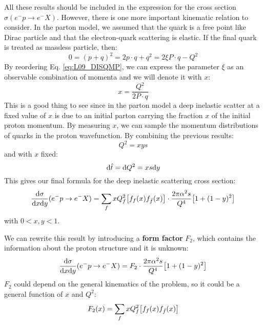 \documentclass[../../main/main.tex]{subfiles}
\begin{document}
All these results should be included in the expression for the cross section \( \sigma(e^-p \longrightarrow e^-X) \). However, there is one more important kinematic relation to consider. In the parton model, we assumed that the quark is a free point like Dirac particle and that the electron-quark scattering is elastic. If the final quark is treated as massless particle, then:
\begin{equation}
	0
	=
	(p + q)^2
	=
	2p \cdot q + q^2
	=
	2\xi P \cdot q - Q^2
	\label{eq:L09_DISQMP}
\end{equation}
By reordering Eq. \ref{eq:L09_DISQMP}, we can express the parameter \( \xi \) as an observable combination of momenta and we will denote it with \( x \):
\begin{equation}
	x
	=
	\frac{Q^2}{2P \cdot q}
	\label{eq:}
\end{equation}
This is a good thing to see since in the parton model a deep inelastic scatter at a fixed value of \( x \) is due to an initial parton carrying the fraction \( x \) of the initial proton momentum. By measuring \( x \), we can sample the momentum distributions of quarks in the proton wavefunction. By combining the previous results:
\begin{equation}
	Q^2
	=
	xys
	\label{eq:}
\end{equation}
and with \( x \) fixed:
\begin{equation}
	\mathrm{d}{\hat{t}}
	=
	\mathrm{d}{Q^2}
	=
	xs \mathrm{d}{y}
	\label{eq:}
\end{equation}
This gives our final formula for the deep inelastic scattering cross section:
\begin{equation}
	\frac{\mathrm{d}{\sigma}}{\mathrm{d}{x}\mathrm{d}{y}}(e^-p \rightarrow e^-X)
	=
	\sum_{f} x Q^2_f \qty[f_f(x) f_{\bar{f}}(x)] \cdot \frac{2\pi \alpha^2 s}{Q^4} \qty[1 + (1-y)^2]
	\label{eq:}
\end{equation}
with \( 0 < x,y < 1 \).

We can rewrite this result by introducing a \textbf{form factor} \( F_2 \), which contains the information about the proton structure and it is unknown:
\begin{equation}
	\frac{\mathrm{d}{\sigma}}{\mathrm{d}{x}\mathrm{d}{y}}(e^-p \rightarrow e^-X)
	=
	F_2 \cdot \frac{2\pi \alpha^2 s}{Q^4} \qty[1 + (1-y)^2]
	\label{eq:}
\end{equation}
\( F_2 \) could depend on the general kinematics of the problem, so it could be a general function of \( x \) and \( Q^2 \):
\begin{equation}
	F_2(x)
	=
	\sum_{f} x Q^2_f \qty[f_f(x) f_{\bar{f}}(x)]
	\label{eq:}
\end{equation}
\end{document}
